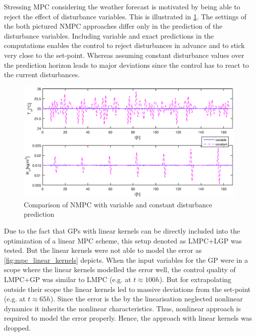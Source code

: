 Stressing MPC considering the weather forecast is motivated by being able to reject the effect of disturbance variables.
This is illustrated in \cref{fig:benefit_mpc}.
The settings of the both pictured NMPC approaches differ only in the prediction of the disturbance variables.
Including variable and exact predictions in the computations enables the control to reject disturbances in advance and to stick very close to the set-point.
Whereas assuming constant disturbance values over the prediction horizon leads to major deviations since the control has to react to the current disturbances.

\begin{figure}[!t]
\begin{center}
		\includegraphics[width=\textwidth]{../Figures/benefit_mpc.eps}
		\caption{Comparison of NMPC with variable and constant disturbance prediction}
		\label{fig:benefit_mpc}
\end{center}
\end{figure}

Due to the fact that GPs with linear kernels can be directly included into the optimization of a linear MPC scheme, this setup denoted as LMPC+LGP was tested.
But the linear kernels were not able to model the error as \cref{fig:mpc_linear_kernels} depicts.
When the input variables for the GP were in a scope where the linear kernels modelled the error well, the control quality of LMPC+GP was similar to LMPC (e.g. at $t \approx \unit{100}{h}$).
But for extrapolating outside their scope the linear kernels led to massive deviations from the set-point (e.g. at $t \approx \unit{65}{h}$).
Since the error is the by the linearisation neglected nonlinear dynamics it inherits the nonlinear characteristics.
Thus, nonlinear approach is required to model the error properly.
Hence, the approach with linear kernels was dropped.

